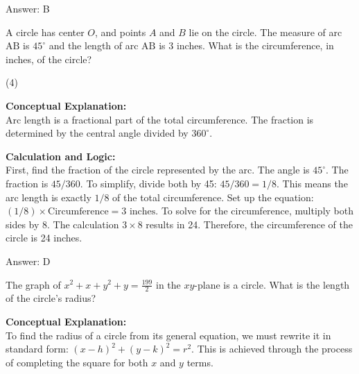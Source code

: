 \documentclass[11pt,paper=a4,answers]{exam}
\begin{document}
\begin{questions}
\begin{solution}
\vspace{30pt}

Answer: \colorbox{yellow!100}{B}
\end{solution}

\vspace{60pt}

\question
A circle has center $O$, and points $A$ and $B$ lie on the circle. The measure of arc $\text{AB}$ is $45^\circ$ and the length of arc $\text{AB}$ is 3 inches. What is the circumference, in inches, of the circle?
\begin{tasks}(4)
\end{tasks}

\begin{solution}
\textbf{Conceptual Explanation:} \\
Arc length is a fractional part of the total circumference. The fraction is determined by the central angle divided by $360^\circ$.

\vspace{30pt}

\textbf{Calculation and Logic:} \\
First, find the fraction of the circle represented by the arc. The angle is $45^\circ$. The fraction is $45 / 360$. To simplify, divide both by 45: $45 / 360 = 1 / 8$. This means the arc length is exactly $1/8$ of the total circumference. Set up the equation: $(1/8) \times \text{Circumference} = 3 \text{ inches}$. To solve for the circumference, multiply both sides by 8. The calculation $3 \times 8$ results in 24. Therefore, the circumference of the circle is 24 inches.

\vspace{30pt}

Answer: \colorbox{yellow!100}{D}
\end{solution}

\vspace{60pt}

\question
The graph of $x^2 + x + y^2 + y = \frac{199}{2}$ in the $xy$-plane is a circle. What is the length of the circle’s radius?

\begin{solution}
\textbf{Conceptual Explanation:} \\
To find the radius of a circle from its general equation, we must rewrite it in standard form: $(x-h)^2 + (y-k)^2 = r^2$. This is achieved through the process of completing the square for both $x$ and $y$ terms.


\end{solution}
\end{questions}
\end{document}
